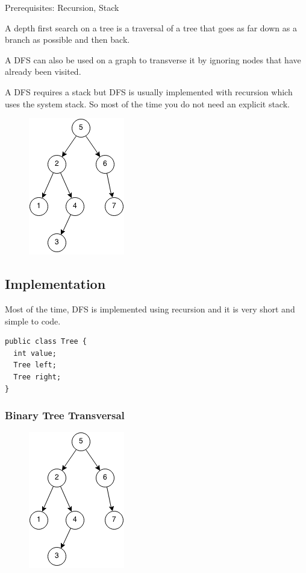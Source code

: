 \documentclass[11pt,oneside]{book}
\makeatletter
\def\maxwidth#1{\ifdim\Gin@nat@width>#1 #1\else\Gin@nat@width\fi}
\makeatother
\begin{document}
Prerequisites: Recursion, Stack

A depth first search on a tree is a traversal of a tree that goes as far down as a branch as possible and then back.

A DFS can also be used on a graph to transverse it by ignoring nodes that have already been visited.

A DFS requires a stack but DFS is usually implemented with recursion which uses the system stack. So most of the time you do not need an explicit stack.

\vspace{5px}\begin{figure}[H]\centering
        \includegraphics[width=0.66\maxwidth{\textwidth}]{dfs.png}
        \end{figure}

\subsection{Implementation}

Most of the time, DFS is implemented using recursion and it is very short and simple to code.

\begin{lstlisting}
public class Tree {
  int value;
  Tree left;
  Tree right;
}
\end{lstlisting}

\subsubsection{Binary Tree Transversal}

\vspace{5px}\begin{figure}[H]\centering
        \includegraphics[width=0.66\maxwidth{\textwidth}]{dfs.png}
        \end{figure}
\end{document}
